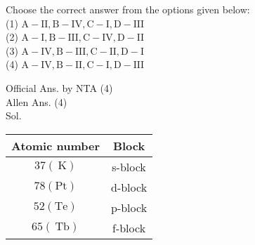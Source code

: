 \documentclass[10pt]{article}
\begin{document}
Choose the correct answer from the options given below:\\
(1) \(\mathrm{A}-\mathrm{II}, \mathrm{B}-\mathrm{IV}, \mathrm{C}-\mathrm{I}, \mathrm{D}-\mathrm{III}\)\\
(2) \(\mathrm{A}-\mathrm{I}, \mathrm{B}-\mathrm{III}, \mathrm{C}-\mathrm{IV}, \mathrm{D}-\mathrm{II}\)\\
(3) \(\mathrm{A}-\mathrm{IV}, \mathrm{B}-\mathrm{III}, \mathrm{C}-\mathrm{II}, \mathrm{D}-\mathrm{I}\)\\
(4) \(\mathrm{A}-\mathrm{IV}, \mathrm{B}-\mathrm{II}, \mathrm{C}-\mathrm{I}, \mathrm{D}-\mathrm{III}\)

Official Ans. by NTA (4)\\
Allen Ans. (4)\\
Sol.

\begin{center}
\begin{tabular}{|c|c|}
\hline
Atomic number & Block \\
\hline
\(37(\mathrm{~K})\) & s-block \\
\hline
\(78(\mathrm{Pt})\) & d-block \\
\hline
\(52(\mathrm{Te})\) & p-block \\
\hline
\(65(\mathrm{~Tb})\) & f-block \\
\hline
\end{tabular}
\end{center}
\end{document}
